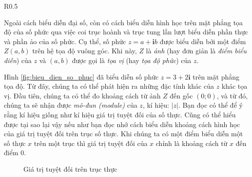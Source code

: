 \documentclass[a4paper, titlepage, openany]{book}
\numberwithin{equation}{chapter}
\begin{document}
\begin{wrapfigure}{R}{0.5\textwidth}
    \centering

   \caption{Biểu diễn $z = 3 + 2\mathbf{i}$ trên mặt phẳng tọa độ}
   \label{fig:bieu_dien_so_phuc}
\end{wrapfigure}

Ngoài cách biểu diễn đại số, còn có cách biểu diễn hình học trên mặt phẳng tọa độ của số phức qua việc coi trục hoành và trục tung lần lượt biểu diễn phần thực và phần ảo của số phức. Cụ thể, số phức $z = a + \mathbf{i}b$ được biểu diễn bởi một điểm $Z(a,b)$ trên hệ tọa độ vuông góc. Khi này, $Z$ là \emph{ảnh} (hay đơn giản là \emph{điểm biểu diễn}) của $z$ và $(a,b)$ được gọi là \emph{tọa vị} (hay \emph{tọa độ phức}) của $z$.

Hình \ref{fig:bieu_dien_so_phuc} đã biểu diễn số phức $z = 3 + 2\mathbf{i}$ trên mặt phẳng tọa độ. Từ đây, chúng ta có thể phát hiện ra những đặc tính khác của $z$ khác tọa vị. Đầu tiên, chúng ta có thể đo khoảng cách từ ảnh $Z$ đến gốc $(0;0)$, và từ đó, chúng ta sẽ nhận được \emph{mô-đun (module)} của $z$, kí hiệu: $|z|$. Bạn đọc có thể để ý rằng kí hiệu giống như kí hiệu giá trị tuyệt đối của số thực. Cũng có thể hiểu được tại sao lại vậy nếu như bạn đọc nhớ cách biểu diễn khoảng cách hình học của giá trị tuyệt đối trên trục số thực. Khi chúng ta có một điểm biểu diễn một số thực $x$ trên một trục thì giá trị tuyệt đối của $x$ chính là khoảng cách từ $x$ đến điểm $0$.

\begin{figure}[h]
   \centering
   \caption{Giá trị tuyệt đối trên trục thực}
   \label{fig:gia_tri_tuyet_doi_thuc}
\end{figure}
\end{document}
